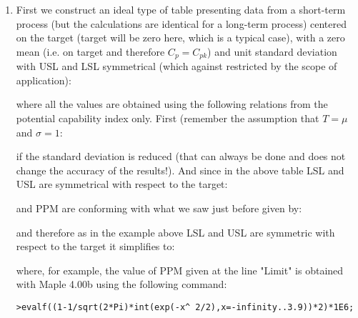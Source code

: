 	\begin{enumerate}
		\item First we construct an ideal type of table presenting data from a short-term process (but the calculations are identical for a long-term process) centered on the target (target will be zero here, which is a typical case), with a zero mean (i.e. on target and therefore $C_p=C_{pk}$) and unit standard deviation with USL and LSL symmetrical (which against restricted by the scope of application):
	
		where all the values are obtained using the following relations from the potential capability index only. First (remember the assumption that $T=\mu$ and $\sigma=1$:
	
	if the standard deviation is reduced (that can always be done and does not change the accuracy of the results!). And since in the above table LSL and USL are symmetrical with respect to the target:
	
	and PPM are conforming with what we saw just before given by:
	
	and therefore as in the example above LSL and USL are symmetric with respect to the target it simplifies to:
	
where, for example, the value of PPM given at the line "Limit" is obtained with Maple 4.00b using the following command:

	\texttt{>evalf((1-1/sqrt(2*Pi)*int(exp(-x\string^ 2/2),x=-infinity..3.9))*2)*1E6;}
	

\end{enumerate}
